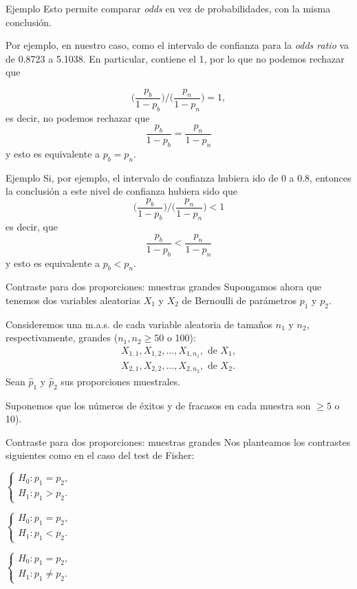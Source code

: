 \documentclass[
  ignorenonframetext,
]{beamer}
\begin{document}
\begin{frame}{Ejemplo}
\protect\hypertarget{ejemplo-39}{}
Esto permite comparar \emph{odds} en vez de probabilidades, con la misma
conclusión.

Por ejemplo, en nuestro caso, como el intervalo de confianza para la
\emph{odds ratio} va de 0.8723 a 5.1038. En particular, contiene el 1,
por lo que no podemos rechazar que

\[
\Big({\frac{p_b}{1-p_b}}\Big)\Big/\Big({\frac{p_n}{1-p_n}}\Big)=1,
\] es decir, no podemos rechazar que \[
\frac{p_b}{1-p_b}=\frac{p_n}{1-p_n}
\] y esto es equivalente a \(p_b=p_n\).
\end{frame}

\begin{frame}{Ejemplo}
\protect\hypertarget{ejemplo-40}{}
Si, por ejemplo, el intervalo de confianza hubiera ido de 0 a 0.8,
entonces la conclusión a este nivel de confianza hubiera sido que \[
\Big({\frac{p_b}{1-p_b}}\Big)\Big/\Big({\frac{p_n}{1-p_n}}\Big)<1
\] es decir, que \[
\frac{p_b}{1-p_b}<\frac{p_n}{1-p_n}
\] y esto es equivalente a \(p_b<p_n\).
\end{frame}

\begin{frame}{Contraste para dos proporciones: muestras grandes}
\protect\hypertarget{contraste-para-dos-proporciones-muestras-grandes}{}
Supongamos ahora que tenemos dos variables aleatorias \(X_1\) y \(X_2\)
de Bernoulli de parámetros \(p_1\) y \(p_2\).

Consideremos una m.a.s. de cada variable aleatoria de tamaños \(n_1\) y
\(n_2\), respectivamente, grandes (\(n_1,n_2\geq 50\) o 100): \[
\begin{array}{l}
X_{1,1}, X_{1,2},\ldots, X_{1,n_1},\mbox{ de }X_1,\\
X_{2,1}, X_{2,2},\ldots, X_{2,n_2},\mbox{ de }X_2.
\end{array}
\] Sean \(\widehat{p}_1\) y \(\widehat{p}_2\) sus proporciones
muestrales.

Suponemos que los números de éxitos y de fracasos en cada muestra son
\(\geq 5\) o 10).
\end{frame}

\begin{frame}{Contraste para dos proporciones: muestras grandes}
\protect\hypertarget{contraste-para-dos-proporciones-muestras-grandes-1}{}
Nos planteamos los contrastes siguientes como en el caso del test de
Fisher:

\(\left\{\begin{array}{l} H_0:p_1=p_2,\\ H_1:p_1> p_2. \end{array}\right.\)

\(\left\{\begin{array}{l} H_0:p_1=p_2,\\ H_1:p_1< p_2. \end{array}\right.\)

\(\left\{\begin{array}{l} H_0:p_1=p_2,\\ H_1:p_1\neq p_2. \end{array}\right.\)
\end{frame}
\end{document}
